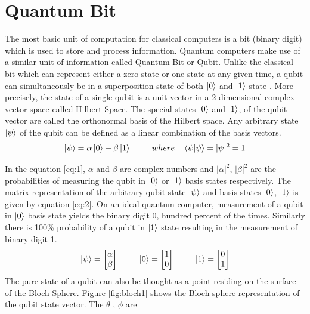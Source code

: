 \documentclass[english,a4paper,11pt,oneside,onecolumn]{book}
\begin{document}
\section{Quantum Bit}
\label{sec:qubit}

The most basic unit of computation for classical computers is a bit (binary digit) which is used to store and process information. Quantum computers make use of a similar unit of information called Quantum Bit or Qubit. Unlike the classical bit which can represent either a zero state or one state at any given time, a qubit can simultaneously be in a superposition state of both $\ket{0}$ and $\ket{1}$ state \cite{nielsen_2019_quantum}. More precisely, the state of a single qubit is a unit vector in a 2-dimensional complex vector space called Hilbert Space. The special states $\ket{0}$ and $\ket{1}$, of the qubit vector are called the orthonormal basis of the Hilbert space. Any arbitrary state \(\ket{\psi}\) of the qubit can be defined as a linear combination of the basis vectors.
\begin{equation}\label{eq:1}
    \ket{\psi} = \alpha\ket{0} + \beta\ket{1} \hspace{25pt}where\hspace{10pt} \braket{\psi|\psi} = |\psi|^2 = 1
\end{equation}

In the equation \ref{eq:1}, \(\alpha\) and \(\beta\) are complex numbers and \(|\alpha|^2\), \(|\beta|^2\) are the probabilities of measuring the qubit in $\ket{0}$ or $\ket{1}$ basis states respectively. The matrix representation of the arbitrary qubit state \(\ket{\psi}\) and basis states \(\ket{0}\), \(\ket{1}\) is given by equation \ref{eq:2}. On an ideal quantum computer, measurement of a qubit in $\ket{0}$ basis state yields the binary digit 0, hundred percent of the times. Similarly there is 100\% probability of a qubit in $\ket{1}$ state resulting in the measurement of binary digit 1. 
\begin{equation}\label{eq:2}
\ket{\psi} = 
\begin{bmatrix}
\alpha\\
\beta
\end{bmatrix}\hspace{25pt}
\ket{0} = 
\begin{bmatrix}
1\\
0
\end{bmatrix}\hspace{25pt}
\ket{1} = 
\begin{bmatrix}
0\\
1
\end{bmatrix}
\end{equation}
The pure state of a qubit can also be thought as a point residing on the surface of the Bloch Sphere. Figure \ref{fig:bloch1} shows the Bloch sphere representation of the qubit state vector. The $\theta$ , $\phi$ are
\end{document}
